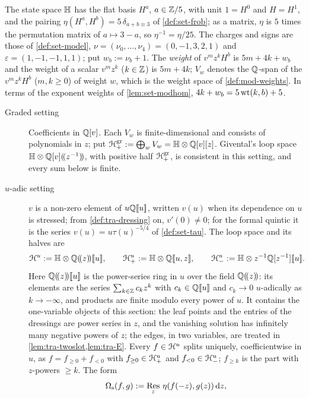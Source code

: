 \begin{conv}
\label{conv:tra-forms}
The state space $\mathbb{H}$ has the flat basis $H^a$, $a\in\mathbb{Z}/5$, with unit $1 = H^0$ and $H = H^1$, and the pairing $\eta(H^a,H^b) = 5\,\delta_{a+b\equiv 3}$ of \cref{def:set-frob}; as a matrix, $\eta$ is $5$ times the permutation matrix of $a\mapsto 3-a$, so $\eta^{-1} = \eta/25$. The charges and signs are those of \cref{def:set-model}, $\nu = (\nu_0,\dots,\nu_4) = (0,-1,3,2,1)$ and $\varepsilon = (1,-1,-1,1,1)$; put $w_b := \nu_b+1$. The \emph{weight} of $v^mz^kH^b$ is $5m+4k+w_b$ and the weight of a scalar $v^mz^k$ ($k\in\mathbb{Z}$) is $5m+4k$; $V_w$ denotes the $\mathbb{Q}$-span of the $v^mz^kH^b$ ($m,k\geq 0$) of weight $w$, which is the weight space of \cref{def:mod-weights}. In terms of the exponent weights of \cref{lem:set-modhom}, $4k+w_b = 5\operatorname{wt}(k,b)+5$.
\begin{description}
\item[Graded setting] Coefficients in $\mathbb{Q}[v]$. Each $V_w$ is finite-dimensional and consists of polynomials in $z$; put $\mathcal{H}^{\mathrm{gr}}_+ := \bigoplus_wV_w = \mathbb{H}\otimes\mathbb{Q}[v][z]$. Givental's loop space $\mathbb{H}\otimes\mathbb{Q}[v](\!(z^{-1})\!)$, with positive half $\mathcal{H}^{\mathrm{gr}}_+$, is consistent in this setting, and every sum below is finite.
\item[$u$-adic setting] $v$ is a non-zero element of $u\mathbb{Q}[\![ u ]\!]$, written $v(u)$ when its dependence on $u$ is stressed; from \cref{def:tra-dressing} on, $v'(0)\neq 0$; for the formal quintic it is the series $v(u) = u\tau(u)^{-5/4}$ of \cref{def:set-tau}. The loop space and its halves are
\[
\cH^u := \bbH\otimes\bbQ\lser{z}\fps{u},\qquad \cH^u_+ := \bbH\otimes\bbQ\fps{u,z},\qquad \cH^u_- := \bbH\otimes z^{-1}\bbQ[z^{-1}]\fps{u}.
\]
Here $\mathbb{Q}(\!(z)\!)[\![ u ]\!]$ is the power-series ring in $u$ over the field $\mathbb{Q}(\!(z)\!)$: its elements are the series $\sum_{k\in\mathbb{Z}}c_kz^k$ with $c_k\in\mathbb{Q}[\![ u ]\!]$ and $c_k\to 0$ $u$-adically as $k\to-\infty$, and products are finite modulo every power of $u$. It contains the one-variable objects of this section: the leaf points and the entries of the dressings are power series in $z$, and the vanishing solution has infinitely many negative powers of $z$; the edges, in two variables, are treated in \cref{lem:tra-twoslot,lem:tra-E}. Every $f\in\mathcal{H}^u$ splits uniquely, coefficientwise in $u$, as $f = f_{\geq 0}+f_{<0}$ with $f_{\geq 0}\in\mathcal{H}^u_+$ and $f_{<0}\in\mathcal{H}^u_-$; $f_{\geq k}$ is the part with $z$-powers $\geq k$. The form
\[
\Omega_{\mathrm s}(f,g) := \operatorname*{Res}_z\,\eta(f(-z),g(z))\,\mathrm{d} z,
\]
\end{description}
\end{conv}
